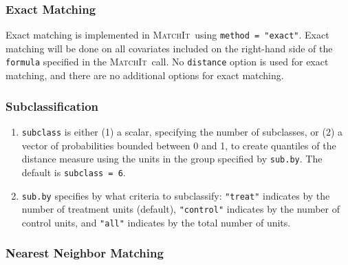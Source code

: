 \documentclass[oneside,letterpaper,titlepage]{article}
\newcommand{\MatchIt}{\textsc{MatchIt}}
\begin{document}
\subsubsection{Exact Matching}
\label{subsubsec:inputs-exact}

Exact matching is implemented in \MatchIt\ using \texttt{method =
  "exact"}.  Exact matching will be done on all covariates included on
the right-hand side of the \texttt{formula} specified in the \MatchIt\
call.  No \texttt{distance} option is used for exact matching, and
there are no additional options for exact matching.

\subsubsection{Subclassification}
\label{subsubsec:inputs-subclass}

\begin{enumerate}
\item \texttt{subclass} is either (1) a scalar, specifying the number
  of subclasses, or (2) a vector of probabilities bounded between 0
  and 1, to create quantiles of the distance measure using the units
  in the group specified by \texttt{sub.by}.  The default is
  \texttt{subclass = 6}.
\item \texttt{sub.by} specifies by what criteria to subclassify:
  \texttt{"treat"} indicates by the number of treatment units
  (default), \texttt{"control"} indicates by the number of control
  units, and \texttt{"all"} indicates by the total number of units.
\end{enumerate}

\subsubsection{Nearest Neighbor Matching}
\label{subsubsec:inputs-nearest}
\end{document}
